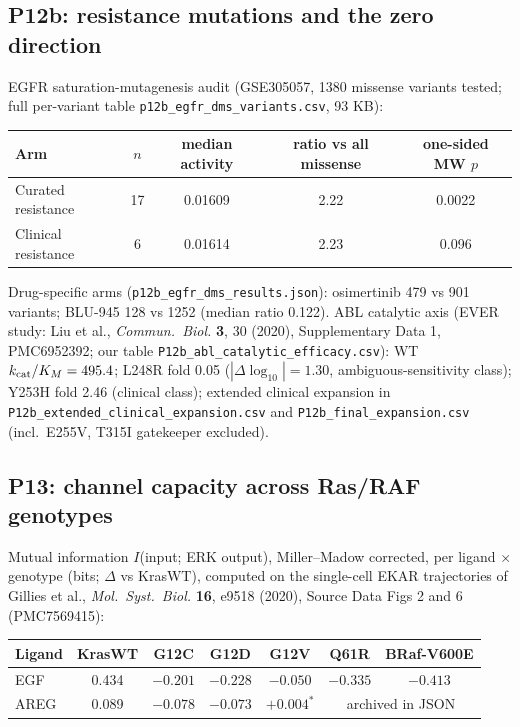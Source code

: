 \documentclass[11pt]{article}
\begin{document}
\subsection{P12b: resistance mutations and the zero direction}

EGFR saturation-mutagenesis audit (GSE305057, 1380 missense variants
tested; full per-variant table
\texttt{p12b\_egfr\_dms\_variants.csv}, 93 KB):

\begin{table}[h]
\centering\small
\begin{tabular}{lcccc}
\toprule
Arm & $n$ & median activity & ratio vs all missense & one-sided MW $p$ \\
\midrule
Curated resistance & 17 & 0.01609 & 2.22 & 0.0022 \\
Clinical resistance & 6 & 0.01614 & 2.23 & 0.096 \\
\bottomrule
\end{tabular}
\end{table}

Drug-specific arms (\texttt{p12b\_egfr\_dms\_results.json}): osimertinib
479 vs 901 variants; BLU-945 128 vs 1252 (median ratio 0.122).
ABL catalytic axis (EVER study: Liu et al., \textit{Commun.\ Biol.}
\textbf{3}, 30 (2020), Supplementary Data 1, PMC6952392; our table
\texttt{P12b\_abl\_catalytic\_efficacy.csv}): WT
$k_{\rm cat}/K_M = 495.4$; L248R fold 0.05 ($|\Delta\log_{10}|=1.30$,
ambiguous-sensitivity class); Y253H fold 2.46 (clinical class); extended
clinical expansion in \texttt{P12b\_extended\_clinical\_expansion.csv}
and \texttt{P12b\_final\_expansion.csv} (incl.\ E255V, T315I gatekeeper
excluded).

\subsection{P13: channel capacity across Ras/RAF genotypes}

Mutual information $I$(input; ERK output), Miller--Madow corrected, per
ligand $\times$ genotype (bits; $\Delta$ vs KrasWT), computed on the
single-cell EKAR trajectories of Gillies et al., \textit{Mol.\ Syst.\
Biol.} \textbf{16}, e9518 (2020), Source Data Figs 2 and 6 (PMC7569415):

\begin{table}[h]
\centering\small
\begin{tabular}{lcccccc}
\toprule
Ligand & KrasWT & G12C & G12D & G12V & Q61R & BRaf-V600E \\
\midrule
EGF & 0.434 & $-0.201$ & $-0.228$ & $-0.050$ & $-0.335$ & $-0.413$ \\
AREG & 0.089 & $-0.078$ & $-0.073$ & $+0.004^*$ & \multicolumn{2}{c}{archived in JSON} \\
\bottomrule
\end{tabular}
\end{table}
\end{document}

